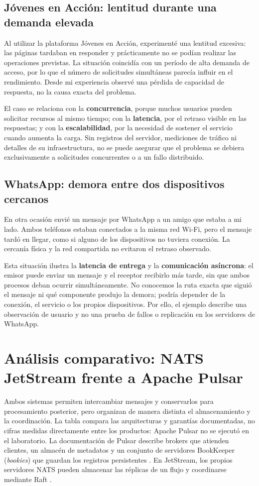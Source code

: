 \documentclass[12pt,a4paper]{article}
\begin{document}
\subsection{Jóvenes en Acción: lentitud durante una demanda elevada}
Al utilizar la plataforma Jóvenes en Acción, experimenté una lentitud excesiva: las páginas tardaban en responder y prácticamente no se podían realizar las operaciones previstas. La situación coincidía con un período de alta demanda de acceso, por lo que el número de solicitudes simultáneas parecía influir en el rendimiento. Desde mi experiencia observé una pérdida de capacidad de respuesta, no la causa exacta del problema.

El caso se relaciona con la \textbf{concurrencia}, porque muchos usuarios pueden solicitar recursos al mismo tiempo; con la \textbf{latencia}, por el retraso visible en las respuestas; y con la \textbf{escalabilidad}, por la necesidad de sostener el servicio cuando aumenta la carga. Sin registros del servidor, mediciones de tráfico ni detalles de su infraestructura, no se puede asegurar que el problema se debiera exclusivamente a solicitudes concurrentes o a un fallo distribuido.

\subsection{WhatsApp: demora entre dos dispositivos cercanos}
En otra ocasión envié un mensaje por WhatsApp a un amigo que estaba a mi lado. Ambos teléfonos estaban conectados a la misma red Wi-Fi, pero el mensaje tardó en llegar, como si alguno de los dispositivos no tuviera conexión. La cercanía física y la red compartida no evitaron el retraso observado.

Esta situación ilustra la \textbf{latencia de entrega} y la \textbf{comunicación asíncrona}: el emisor puede enviar un mensaje y el receptor recibirlo más tarde, sin que ambos procesos deban ocurrir simultáneamente. No conocemos la ruta exacta que siguió el mensaje ni qué componente produjo la demora; podría depender de la conexión, el servicio o los propios dispositivos. Por ello, el ejemplo describe una observación de usuario y no una prueba de fallos o replicación en los servidores de WhatsApp.

\section{Análisis comparativo: NATS JetStream frente a Apache Pulsar}
Ambos sistemas permiten intercambiar mensajes y conservarlos para procesamiento posterior, pero organizan de manera distinta el almacenamiento y la coordinación. La tabla compara las arquitecturas y garantías documentadas, no cifras medidas directamente entre los productos: Apache Pulsar no se ejecutó en el laboratorio. La documentación de Pulsar describe brokers que atienden clientes, un almacén de metadatos y un conjunto de servidores BookKeeper (\emph{bookies}) que guardan los registros persistentes \cite{pulsararchitecture}. En JetStream, los propios servidores NATS pueden almacenar las réplicas de un flujo y coordinarse mediante Raft \cite{natsclustering,natsreplication}.
\end{document}
